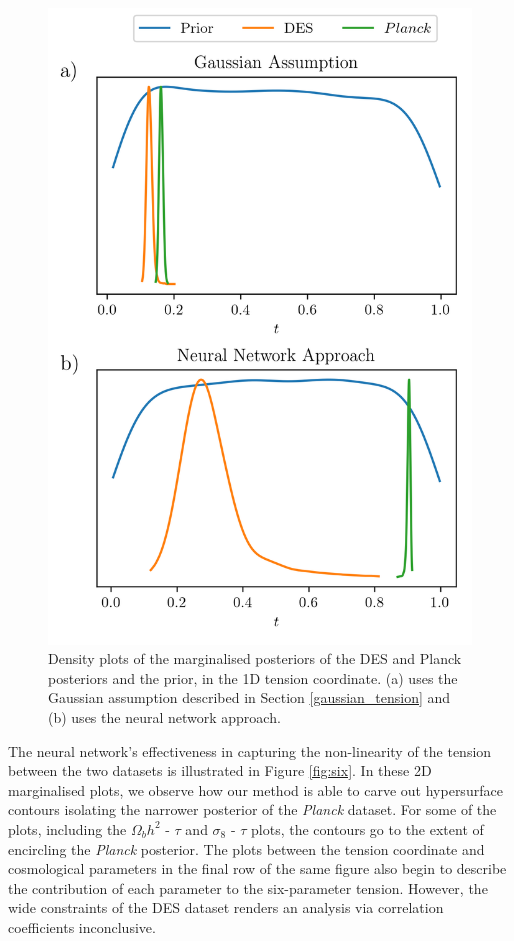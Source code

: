 \documentclass[%
 reprint,
 amsmath,amssymb,
 aps,
]{revtex4-2}
\begin{document}
\begin{figure}
    \includegraphics[width=0.8\columnwidth]{../plots/six_1d_compare.png}
    \centering
    \caption{Density plots of the marginalised posteriors of the DES and Planck posteriors and the prior, in the 1D tension coordinate. (a) uses the Gaussian assumption described in Section \ref{gaussian_tension} and (b) uses the neural network approach.}
    \label{fig:six_compare}
\end{figure}

The neural network's effectiveness in capturing the non-linearity of the tension between the two datasets is illustrated in Figure \ref{fig:six}. In these 2D marginalised plots, we observe how our method is able to carve out hypersurface contours isolating the narrower posterior of the \textit{Planck} dataset. For some of the plots, including the $\Omega_b h^2$ - $\tau$ and $\sigma_8$ - $\tau$ plots, the contours go to the extent of encircling the \textit{Planck} posterior. The plots between the tension coordinate and cosmological parameters in the final row of the same figure also begin to describe the contribution of each parameter to the six-parameter tension. However, the wide constraints of the DES dataset renders an analysis via correlation coefficients inconclusive.
\end{document}
